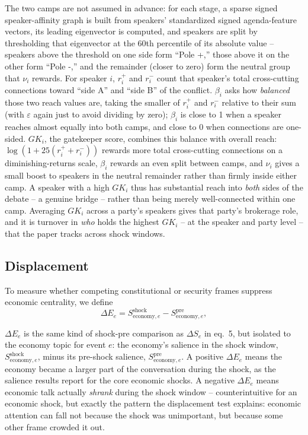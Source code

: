 \documentclass[conference]{IEEEtran}
\begin{document}
The two camps are not assumed in advance: for each stage, a sparse signed speaker-affinity graph is built from speakers' standardized signed agenda-feature vectors, its leading eigenvector is computed, and speakers are split by thresholding that eigenvector at the 60th percentile of its absolute value -- speakers above the threshold on one side form ``Pole +,'' those above it on the other form ``Pole -,'' and the remainder (closer to zero) form the neutral group that $\nu_i$ rewards. For speaker $i$, $r_i^+$ and $r_i^-$ count that speaker's total cross-cutting connections toward ``side A'' and ``side B'' of the conflict. $\beta_i$ asks how \emph{balanced} those two reach values are, taking the smaller of $r_i^+$ and $r_i^-$ relative to their sum (with $\varepsilon$ again just to avoid dividing by zero); $\beta_i$ is close to 1 when a speaker reaches almost equally into both camps, and close to 0 when connections are one-sided. $GK_i$, the gatekeeper score, combines this balance with overall reach: $\log(1 + 25(r_i^+ + r_i^-))$ rewards more total cross-cutting connections on a diminishing-returns scale, $\beta_i$ rewards an even split between camps, and $\nu_i$ gives a small boost to speakers in the neutral remainder rather than firmly inside either camp. A speaker with a high $GK_i$ thus has substantial reach into \emph{both} sides of the debate -- a genuine bridge -- rather than being merely well-connected within one camp. Averaging $GK_i$ across a party's speakers gives that party's brokerage role, and it is turnover in \emph{who} holds the highest $GK_i$ -- at the speaker and party level -- that the paper tracks across shock windows.

\subsection{Displacement}
To measure whether competing constitutional or security frames suppress economic centrality, we define
\begin{equation}
\Delta E_e = S^{\text{shock}}_{\text{economy},e} - S^{\text{pre}}_{\text{economy},e},
\end{equation}

$\Delta E_e$ is the same kind of shock-pre comparison as $\Delta S_e$ in eq.~5, but isolated to the economy topic for event $e$: the economy's salience in the shock window, $S^{\text{shock}}_{\text{economy},e}$, minus its pre-shock salience, $S^{\text{pre}}_{\text{economy},e}$. A positive $\Delta E_e$ means the economy became a larger part of the conversation during the shock, as the salience results report for the core economic shocks. A negative $\Delta E_e$ means economic talk actually \emph{shrank} during the shock window -- counterintuitive for an economic shock, but exactly the pattern the displacement test explains: economic attention can fall not because the shock was unimportant, but because some other frame crowded it out.
\end{document}
